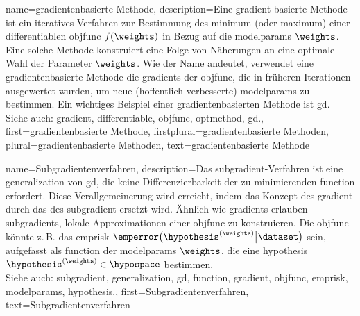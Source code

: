 {{{{
{name={gradientenbasierte Methode}, 
	description={Eine \Gls{gradient}-basierte 
		Methode ist ein iteratives Verfahren zur Bestimmung des \gls{minimum} (oder \gls{maximum}) 
		einer \gls{differentiable}n \gls{objfunc} $f(\weights)$ in Bezug auf die \glspl{modelparam} $\weights$. 
		Eine solche Methode konstruiert eine Folge von Näherungen an eine optimale Wahl der Parameter $\weights$. 
		Wie der Name andeutet, verwendet eine gradientenbasierte Methode die \glspl{gradient} 
		der \gls{objfunc}, die in früheren Iterationen ausgewertet wurden, 
		um neue (hoffentlich verbesserte) \glspl{modelparam} zu bestimmen. 
		Ein wichtiges Beispiel einer gradientenbasierten Methode ist \gls{gd}.\\
		Siehe auch: \gls{gradient}, \gls{differentiable}, \gls{objfunc}, \gls{optmethod}, \gls{gd}.},
	first={gradientenbasierte Methode},
	firstplural={gradientenbasierte Methoden},
	plural={gradientenbasierte Methoden},
	text={gradientenbasierte Methode} 
}

{name={Subgradientenverfahren}, 
	description={Das \Gls{subgradient}-Verfahren 
		ist eine \gls{generalization} von \gls{gd}, 
		die keine Differenzierbarkeit der zu minimierenden \gls{function} erfordert. 
		Diese Verallgemeinerung wird erreicht, indem das Konzept des \gls{gradient} 
		durch das des \gls{subgradient} ersetzt wird. 
		Ähnlich wie \glspl{gradient} erlauben \glspl{subgradient}, 
		lokale Approximationen einer \gls{objfunc} zu konstruieren. 
		Die \gls{objfunc} könnte z.\,B. das \gls{emprisk} 
		$\emperror\big( \hypothesis^{(\weights)} \big| \dataset \big)$ sein, 
		aufgefasst als \gls{function} der \glspl{modelparam} $\weights$, 
		die eine \gls{hypothesis} $\hypothesis^{(\weights)} \in \hypospace$ bestimmen.\\
		Siehe auch: \gls{subgradient}, \gls{generalization}, \gls{gd}, \gls{function}, \gls{gradient}, \gls{objfunc}, \gls{emprisk}, \glspl{modelparam}, \gls{hypothesis}.},
	first={Subgradientenverfahren},
	text={Subgradientenverfahren} 
}

}}}}
